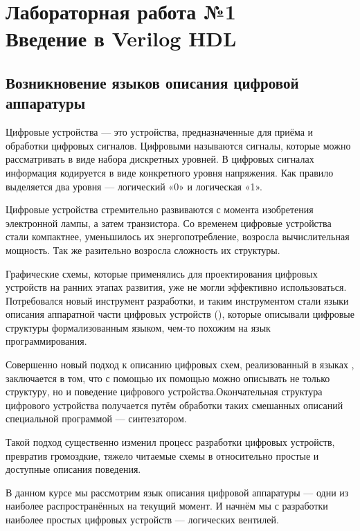 \chapter{Лабораторная работа №1\\Введение в Verilog HDL} 
\section{Возникновение языков описания цифровой аппаратуры}

\par{Цифровые устройства — это устройства, предназначенные для приёма и обработки цифровых сигналов. Цифровыми называются сигналы, которые можно рассматривать в виде набора дискретных уровней. В цифровых сигналах информация кодируется в виде конкретного уровня напряжения. Как правило выделяется два уровня — логический «0» и логическая «1».}

\par{Цифровые устройства стремительно развиваются с момента изобретения электронной лампы, а затем транзистора. Со временем цифровые устройства стали компактнее, уменьшилось их энергопотребление, возросла вычислительная мощность. Так же разительно возросла сложность их структуры.}

\par{Графические схемы, которые применялись для проектирования цифровых устройств на ранних этапах развития, уже не могли эффективно использоваться. Потребовался новый инструмент разработки, и таким инструментом стали языки описания аппаратной части цифровых устройств (), которые описывали цифровые структуры формализованным языком, чем-то похожим на язык программирования.}

\par{Совершенно новый подход к описанию цифровых схем, реализованный в языках , заключается в том, что с помощью их помощью можно описывать не только структуру, но и поведение цифрового устройства.Окончательная структура цифрового устройства получается путём обработки таких смешанных описаний специальной программой — синтезатором.}

\par{Такой подход существенно изменил процесс разработки цифровых устройств, превратив громоздкие, тяжело читаемые схемы в относительно простые и доступные описания поведения.}

\par{В данном курсе мы рассмотрим язык описания цифровой аппаратуры  — одни из наиболее распространённых на текущий момент. И начнём мы с разработки наиболее простых цифровых устройств — логических вентилей.}

